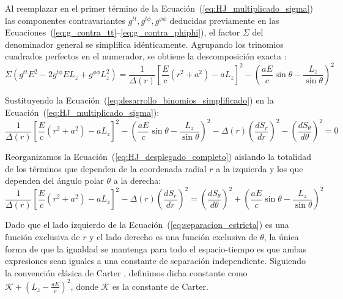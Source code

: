 Al reemplazar en el primer término de la Ecuación~(\ref{eq:HJ_multiplicado_sigma}) las componentes contravariantes $g^{tt}, g^{t\phi}, g^{\phi\phi}$ deducidas previamente en las Ecuaciones~(\ref{eq:g_contra_tt}--\ref{eq:g_contra_phiphi}), el factor $\Sigma$ del denominador general se simplifica idénticamente. Agrupando los trinomios cuadrados perfectos en el numerador, se obtiene la descomposición exacta \citep{pdfcoffee.com_chandrasekhar, Grenzebach2014}:
\begin{equation}
    \Sigma \left( g^{tt} E^2 - 2g^{t\phi} E L_z + g^{\phi\phi} L_z^2 \right) = \frac{1}{\Delta(r)} \left[ \frac{E}{c}(r^2+a^2) - a L_z \right]^2 - \left( \frac{a E}{c} \sin\theta - \frac{L_z}{\sin\theta} \right)^2
    \label{eq:desarrollo_binomios_simplificado}
\end{equation}

Sustituyendo la Ecuación~(\ref{eq:desarrollo_binomios_simplificado}) en la Ecuación~(\ref{eq:HJ_multiplicado_sigma}):
\begin{equation}
    \frac{1}{\Delta(r)} \left[ \frac{E}{c}(r^2+a^2) - a L_z \right]^2 - \left( \frac{a E}{c} \sin\theta - \frac{L_z}{\sin\theta} \right)^2 - \Delta(r) \left(\frac{dS_r}{dr}\right)^2 - \left(\frac{dS_\theta}{d\theta}\right)^2 = 0
    \label{eq:HJ_desplegado_completo}
\end{equation}

Reorganizamos la Ecuación~(\ref{eq:HJ_desplegado_completo}) aislando la totalidad de los términos que dependen de la coordenada radial $r$ a la izquierda y los que dependen del ángulo polar $\theta$ a la derecha:
\begin{equation}
    \frac{1}{\Delta(r)} \left[ \frac{E}{c}(r^2+a^2) - a L_z \right]^2 - \Delta(r) \left(\frac{dS_r}{dr}\right)^2 = \left(\frac{dS_\theta}{d\theta}\right)^2 + \left( \frac{a E}{c} \sin\theta - \frac{L_z}{\sin\theta} \right)^2
    \label{eq:separacion_estricta}
\end{equation}

Dado que el lado izquierdo de la Ecuación~(\ref{eq:separacion_estricta}) es una función exclusiva de $r$ y el lado derecho es una función exclusiva de $\theta$, la única forma de que la igualdad se mantenga para todo el espacio-tiempo es que ambas expresiones sean iguales a una constante de separación independiente. Siguiendo la convención clásica de Carter \citep{pdfcoffee.com_chandrasekhar, 1403.5234v2}, definimos dicha constante como $\mathcal{K} + \left(L_z - \frac{a E}{c}\right)^2$, donde $\mathcal{K}$ es la constante de Carter.

